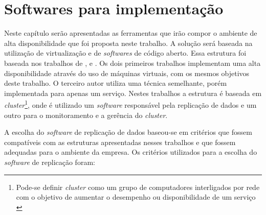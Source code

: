   \chapter{Softwares para implementação}
\label{cap:softwares}




Neste capítulo serão apresentadas as ferramentas que irão compor o ambiente de alta disponibilidade que foi proposta neste trabalho. A solução 
será baseada na utilização de virtualização e de \textit{softwares} de código aberto. Essa estrutura foi baseada nos trabalhos de 
\citet{goncalves2009}, \citet{reis2009} e \citet{zaminhani2008}. Os dois primeiros trabalhos implementam uma alta disponibilidade através do uso 
de máquinas virtuais, com os mesmos objetivos deste trabalho. O terceiro autor utiliza uma técnica semelhante, porém implementada para apenas 
um serviço. Nestes trabalhos a estrutura é baseada em \textit{cluster}\footnote[1]{Pode-se definir \textit{cluster} como um grupo de computadores 
interligados por rede com o objetivo de aumentar o desempenho ou disponibilidade de um serviço \cite{freitas2005}}, onde é utilizado um 
\textit{software} responsável pela replicação de dados e um outro para o monitoramento e a gerência do \textit{cluster}. 

A escolha do \textit{software} de replicação de dados baseou-se em critérios que fossem compatíveis com as estruturas apresentadas nesses 
trabalhos e que fossem adequadas para o ambiente da empresa. Os critérios utilizados para a escolha do \textit{software} de replicação foram:

